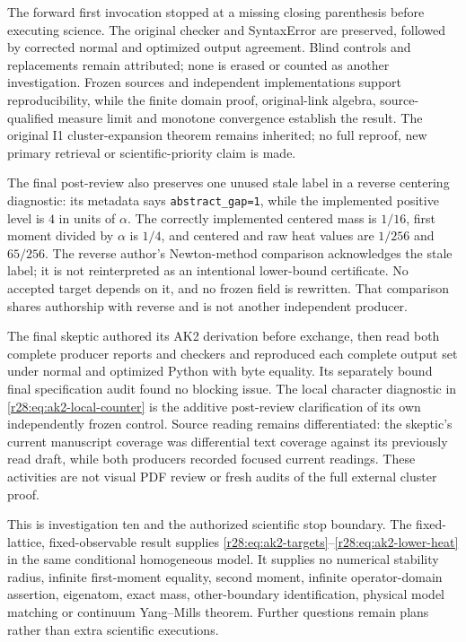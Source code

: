 The forward first invocation stopped at a missing closing parenthesis before executing science. The original checker and SyntaxError are preserved, followed by corrected normal and optimized output agreement. Blind controls and replacements remain attributed; none is erased or counted as another investigation. Frozen sources and independent implementations support reproducibility, while the finite domain proof, original-link algebra, source-qualified measure limit and monotone convergence establish the result. The original I1 cluster-expansion theorem remains inherited; no full reproof, new primary retrieval or scientific-priority claim is made.

The final post-review also preserves one unused stale label in a reverse centering diagnostic: its metadata says \texttt{abstract\_gap=1}, while the implemented positive level is $4$ in units of $\alpha$. The correctly implemented centered mass is $1/16$, first moment divided by $\alpha$ is $1/4$, and centered and raw heat values are $1/256$ and $65/256$. The reverse author's Newton-method comparison acknowledges the stale label; it is not reinterpreted as an intentional lower-bound certificate. No accepted target depends on it, and no frozen field is rewritten. That comparison shares authorship with reverse and is not another independent producer.

The final skeptic authored its AK2 derivation before exchange, then read both complete producer reports and checkers and reproduced each complete output set under normal and optimized Python with byte equality. Its separately bound final specification audit found no blocking issue. The local character diagnostic in \eqref{r28:eq:ak2-local-counter} is the additive post-review clarification of its own independently frozen control. Source reading remains differentiated: the skeptic's current manuscript coverage was differential text coverage against its previously read draft, while both producers recorded focused current readings. These activities are not visual PDF review or fresh audits of the full external cluster proof.

This is investigation ten and the authorized scientific stop boundary. The fixed-lattice, fixed-observable result supplies \eqref{r28:eq:ak2-targets}--\eqref{r28:eq:ak2-lower-heat} in the same conditional homogeneous model. It supplies no numerical stability radius, infinite first-moment equality, second moment, infinite operator-domain assertion, eigenatom, exact mass, other-boundary identification, physical model matching or continuum Yang--Mills theorem. Further questions remain plans rather than extra scientific executions.
